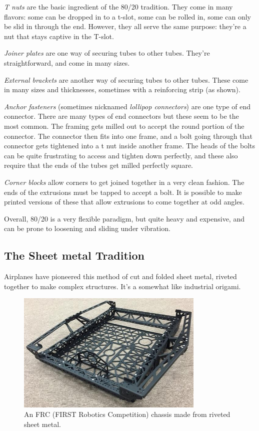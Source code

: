 	\begin{asparaenum}[a)]
		\item \textit{T nuts} are the basic ingredient of the 80/20 tradition. They come in many flavors: some can be dropped in to a t-slot, some can be rolled in, some can only be slid in through the end. However, they all serve the same purpose: they're a nut that stays captive in the T-slot.
		\item \textit{Joiner plates} are one way of securing tubes to other tubes. They're straightforward, and come in many sizes.
		\item \textit{External brackets} are another way of securing tubes to other tubes. These come in many sizes and thicknesses, sometimes with a reinforcing strip (as shown).
		\item \textit{Anchor fasteners} (sometimes nicknamed \textit{lollipop connectors}) are one type of end connector. There are many types of end connectors but these seem to be the most common. The framing gets milled out to accept the round portion of the connector. The connector then fits into one frame, and a bolt going through that connector gets tightened into a t nut inside another frame. The heads of the bolts can be quite frustrating to access and tighten down perfectly, and these also require that the ends of the tubes get milled perfectly square.
		\item \textit{Corner blocks} allow corners to get joined together in a very clean fashion. The ends of the extrusions must be tapped to accept a bolt. It is possible to make printed versions of these that allow extrusions to come together at odd angles.
	\end{asparaenum}
	
	Overall, 80/20 is a very flexible paradigm, but quite heavy and expensive, and can be prone to loosening and sliding under vibration.
	
	\subsection{The Sheet metal Tradition}
	Airplanes have pioneered this method of cut and folded sheet metal, riveted together to make complex structures. It's a somewhat like industrial origami.
	
	\begin{figure}[H]
		\includegraphics[width=0.8\textwidth]{imgs/tradition_sheetmetal_148.png}
		\caption{An FRC (FIRST Robotics Competition) chassis made from riveted sheet metal.}
	\end{figure}
	

